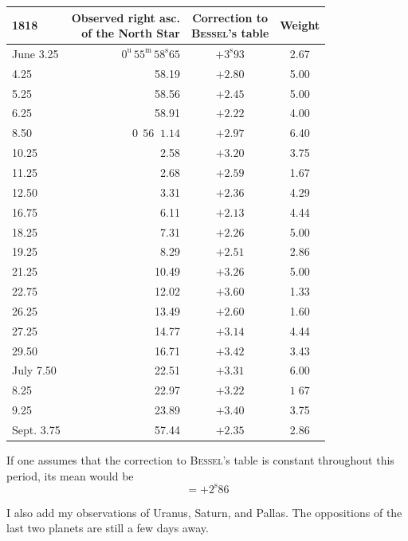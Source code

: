 \begin{center}
\begin{tabular}{l|r|c|c}
1818 & \shortstack{Observed right asc.\\of the North Star} & \shortstack{Correction to\\\textsc{Bessel}’s table} & Weight \\
\hline
June 3.25 & $0^{\mathrm u}\,55^{\mathrm m}\,58^{\mathrm s}65$ & $+3^{\mathrm s}93$ & 2.67 \\
4.25 & 58.19 & $+2.80$ & 5.00 \\
5.25 & 58.56 & $+2.45$ & 5.00 \\
6.25 & 58.91 & $+2.22$ & 4.00 \\
8.50 & $0\,\;56\;\;1.14$ & $+2.97$ & 6.40 \\
10.25 & 2.58 & $+3.20$ & 3.75 \\
11.25 & 2.68 & $+2.59$ & 1.67 \\
12.50 & 3.31 & $+2.36$ & 4.29 \\
16.75 & 6.11 & $+2.13$ & 4.44 \\
18.25 & 7.31 & $+2.26$ & 5.00 \\
19.25 & 8.29 & $+2.51$ & 2.86 \\
21.25 & 10.49 & $+3.26$ & 5.00 \\
22.75 & 12.02 & $+3.60$ & 1.33 \\
26.25 & 13.49 & $+2.60$ & 1.60 \\
27.25 & 14.77 & $+3.14$ & 4.44 \\
29.50 & 16.71 & $+3.42$ & 3.43 \\
July 7.50 & 22.51 & $+3.31$ & 6.00 \\
8.25 & 22.97 & $+3.22$ & $1\;67$ \\
9.25 & 23.89 & $+3.40$ & 3.75 \\
Sept. 3.75 & 57.44 & $+2.35$ & 2.86 \\
\end{tabular}
\end{center}

\par\indent If one assumes that the correction to \textsc{Bessel}’s table is constant throughout this period, its mean would be
\[
= +2^{\mathrm s}86
\]

\par\indent I also add my observations of Uranus, Saturn, and Pallas. The oppositions of the last two planets are still a few days away.


